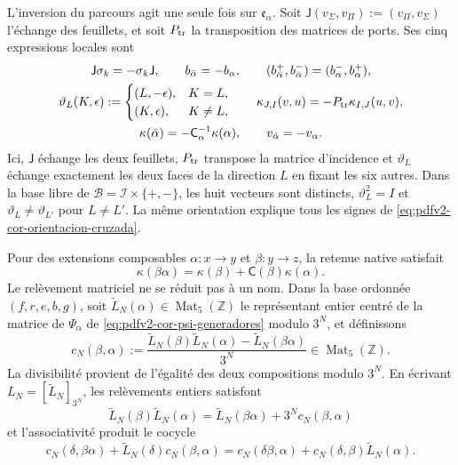 L'inversion du parcours agit une seule fois sur \(\mathfrak e_\alpha\). Soit \(\mathsf J(v_\Sigma,v_\Pi):=(v_\Pi,v_\Sigma)\) l'échange des feuillets, et soit \(P_{\rm tr}\) la transposition des matrices de ports. Ses cinq expressions locales sont
\begin{equation}
\label{eq:pdfv2-cor-orientacion-cruzada}
 \begin{gathered}
 \mathsf J\sigma_k=-\sigma_k\mathsf J,
 \qquad b_{\bar\alpha}=-b_\alpha,
 \qquad (b_{\bar\alpha}^+,b_{\bar\alpha}^-)
       =(b_\alpha^-,b_\alpha^+),\\
 \vartheta_L(K,\epsilon):=
 \begin{cases}
  (L,-\epsilon),&K=L,\\
  (K,\epsilon),&K\neq L,
 \end{cases}
 \qquad
 \kappa_{J,I}(v,u)=-P_{\rm tr}\kappa_{I,J}(u,v),\\
 \kappa(\bar\alpha)
 =-\mathsf C_\alpha^{-1}\kappa(\alpha),
 \qquad v_{\bar\alpha}=-v_\alpha.
 \end{gathered}
\end{equation}
Ici, \(\mathsf J\) échange les deux feuillets, \(P_{\rm tr}\) transpose la matrice d'incidence et \(\vartheta_L\) échange exactement les deux faces de la direction \(L\) en fixant les six autres. Dans la base libre de \(\mathscr B=\mathscr I\times\{+,-\}\), les huit vecteurs sont distincts, \(\vartheta_L^2=I\) et \(\vartheta_L\neq\vartheta_{L'}\) pour \(L\neq L'\). La même orientation explique tous les signes de \eqref{eq:pdfv2-cor-orientacion-cruzada}.

Pour des extensions composables \(\alpha:x\to y\) et \(\beta:y\to z\), la retenue native satisfait
\begin{equation}
\label{eq:pdfv2-cor-carry-nativo}
 \kappa(\beta\alpha)=
 \kappa(\beta)+\mathsf C(\beta)\kappa(\alpha).
\end{equation}
Le relèvement matriciel ne se réduit pas à un nom. Dans la base ordonnée \((f,r,e,b,g)\), soit \(\widetilde L_N(\alpha)\in\operatorname{Mat}_5(\mathbb Z)\) le représentant entier centré de la matrice de \(\Psi_\alpha\) de \eqref{eq:pdfv2-cor-psi-generadores} modulo \(3^N\), et définissons
\begin{equation}
\label{eq:pdfv2-cor-carry-matricial-def}
 c_N(\beta,\alpha):=
 \frac{\widetilde L_N(\beta)\widetilde L_N(\alpha)
       -\widetilde L_N(\beta\alpha)}{3^N}
 \in\operatorname{Mat}_5(\mathbb Z).
\end{equation}
La divisibilité provient de l'égalité des deux compositions modulo \(3^N\). En écrivant \(L_N=[\widetilde L_N]_{3^N}\), les relèvements entiers satisfont
\begin{equation}
\label{eq:pdfv2-cor-carry-matricial}
 \widetilde L_N(\beta)\widetilde L_N(\alpha)
 =\widetilde L_N(\beta\alpha)+3^Nc_N(\beta,\alpha)
\end{equation}
et l'associativité produit le cocycle
\begin{equation}
\label{eq:pdfv2-cor-cociclo-matricial}
 c_N(\delta,\beta\alpha)+\widetilde L_N(\delta)c_N(\beta,\alpha)
 =c_N(\delta\beta,\alpha)
  +c_N(\delta,\beta)\widetilde L_N(\alpha).
\end{equation}

